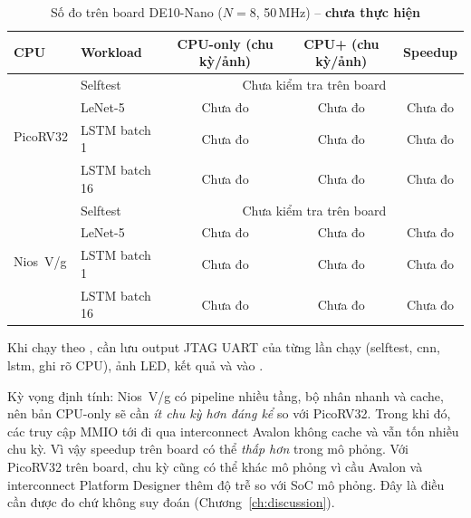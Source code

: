 \begin{table}[H]
  \centering
  \caption{Số đo trên board DE10-Nano ($N=8$, 50\,MHz) -- \textbf{chưa thực hiện}}
  \label{tab:board}
  \small
  \setlength{\tabcolsep}{4pt}
  \begin{tabular}{llccc}
    \toprule
    CPU & Workload & CPU-only (chu kỳ/ảnh) & CPU+\NPU{} (chu kỳ/ảnh) & Speedup \\
    \midrule
    \multirow{4}{*}{PicoRV32} & Selftest & \multicolumn{3}{c}{Chưa kiểm tra trên board} \\
     & LeNet-5 & Chưa đo & Chưa đo & Chưa đo \\
     & LSTM batch 1 & Chưa đo & Chưa đo & Chưa đo \\
     & LSTM batch 16 & Chưa đo & Chưa đo & Chưa đo \\
    \midrule
    \multirow{4}{*}{Nios~V/g} & Selftest & \multicolumn{3}{c}{Chưa kiểm tra trên board} \\
     & LeNet-5 & Chưa đo & Chưa đo & Chưa đo \\
     & LSTM batch 1 & Chưa đo & Chưa đo & Chưa đo \\
     & LSTM batch 16 & Chưa đo & Chưa đo & Chưa đo \\
    \bottomrule
  \end{tabular}

  \smallskip
  \raggedright\footnotesize Khi chạy theo , cần lưu output JTAG UART của từng lần chạy (selftest, cnn, lstm, ghi rõ CPU), ảnh LED, kết quả  và  vào .
\end{table}

Kỳ vọng định tính: Nios~V/g có pipeline nhiều tầng, bộ nhân nhanh và cache, nên bản CPU-only sẽ cần \emph{ít chu kỳ hơn đáng kể} so với PicoRV32. Trong khi đó, các truy cập MMIO tới \NPU{} đi qua interconnect Avalon không cache và vẫn tốn nhiều chu kỳ. Vì vậy speedup trên board có thể \emph{thấp hơn} trong mô phỏng. Với PicoRV32 trên board, chu kỳ cũng có thể khác mô phỏng vì cầu Avalon và interconnect Platform Designer thêm độ trễ so với SoC mô phỏng. Đây là điều cần được đo chứ không suy đoán (Chương~\ref{ch:discussion}).
